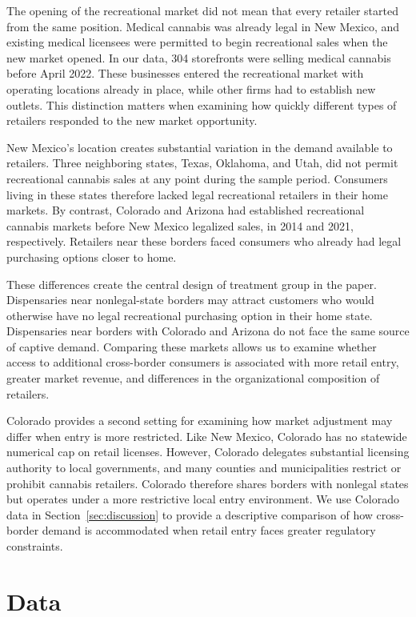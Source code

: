 \documentclass[english,12pt]{article}
\begin{document}
The opening of the recreational market did not mean that every retailer started from the same position. Medical cannabis was already legal in New Mexico, and existing medical licensees were permitted to begin recreational sales when the new market opened. In our data, 304 storefronts were selling medical cannabis before April 2022. These businesses entered the recreational market with operating locations already in place, while other firms had to establish new outlets. This distinction matters when examining how quickly different types of retailers responded to the new market opportunity.

New Mexico's location creates substantial variation in the demand available to retailers. Three neighboring states, Texas, Oklahoma, and Utah, did not permit recreational cannabis sales at any point during the sample period. Consumers living in these states therefore lacked legal recreational retailers in their home markets. By contrast, Colorado and Arizona had established recreational cannabis markets before New Mexico legalized sales, in 2014 and 2021, respectively. Retailers near these borders faced consumers who already had legal purchasing options closer to home.

These differences create the central design of treatment group in the paper. Dispensaries near nonlegal-state borders may attract customers who would otherwise have no legal recreational purchasing option in their home state. Dispensaries near borders with Colorado and Arizona do not face the same source of captive demand. Comparing these markets allows us to examine whether access to additional cross-border consumers is associated with more retail entry, greater market revenue, and differences in the organizational composition of retailers.

Colorado provides a second setting for examining how market adjustment may differ when entry is more restricted. Like New Mexico, Colorado has no statewide numerical cap on retail licenses. However, Colorado delegates substantial licensing authority to local governments, and many counties and municipalities restrict or prohibit cannabis retailers. Colorado therefore shares borders with nonlegal states but operates under a more restrictive local entry environment. We use Colorado data in Section~\ref{sec:discussion} to provide a descriptive comparison of how cross-border demand is accommodated when retail entry faces greater regulatory constraints.


\section{Data}
\label{sec:data}
\end{document}
